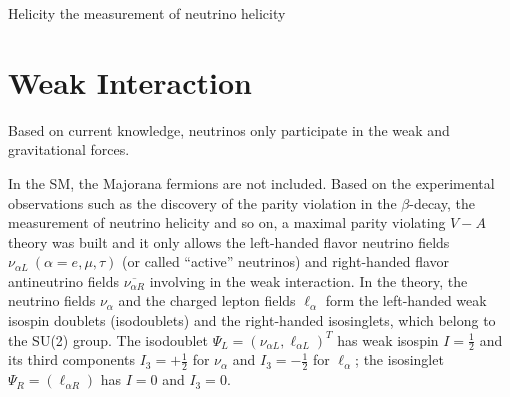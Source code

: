 Helicity the measurement of neutrino helicity\cite{goldhaber1958helicity} 


\section{Weak Interaction}\label{sect:weakInteraction}

Based on current knowledge, neutrinos only participate in the weak and gravitational forces.
 
In the SM, the Majorana fermions are not included. Based on the experimental observations such as the discovery of the parity violation in the $\beta$-decay\cite{wu1957experimental}, the measurement of neutrino helicity\cite{goldhaber1958helicity} and so on, a maximal parity violating $V-A$ theory was built and it only allows the left-handed flavor neutrino fields $\nu_{\alpha L}~(\alpha=e,\mu,\tau)$ (or called ``active'' neutrinos) and right-handed flavor antineutrino fields $\overline{\nu_{\alpha R}}$ involving in the weak interaction. In the theory, the neutrino fields $\nu_\alpha$ and the charged lepton fields $\ell_\alpha$ form the left-handed weak isospin doublets (isodoublets) and the right-handed isosinglets, which belong to the SU(2) group. The isodoublet $\Psi_L = (\nu_{\alpha L}, \ell_{\alpha L})^T$ has weak isospin $I=\frac{1}{2}$ and its third components $I_3=+\frac{1}{2}$ for $\nu_\alpha$ and $I_3=-\frac{1}{2}$ for $\ell_\alpha$; the isosinglet $\Psi_R = (\ell_{\alpha R})$ has $I=0$ and $I_3=0$\cite{aitchison2012gauge, greiner2012theoretical}.

